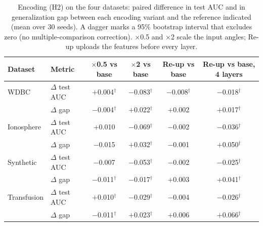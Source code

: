 \begin{table}[t]
\centering
\caption{Encoding (H2) on the four datasets: paired difference in test AUC and in generalization gap between each encoding variant and the reference indicated (mean over 30 seeds). A dagger marks a 95\% bootstrap interval that excludes zero (no multiple-comparison correction). $\times$0.5 and $\times$2 scale the input angles; Re-up uploads the features before every layer.}
\label{tab:h2real}
\footnotesize
\setlength{\tabcolsep}{4pt}
\begin{tabular}{llcccc}
\hline
Dataset & Metric & $\times$0.5 vs base & $\times$2 vs base & Re-up vs base & Re-up vs base, 4 layers \\
\hline
WDBC & $\Delta$ test AUC & $+$0.004$^{\dagger}$ & $-$0.083$^{\dagger}$ & $-$0.008$^{\dagger}$ & $-$0.018$^{\dagger}$ \\
 & $\Delta$ gap & $-$0.004$^{\dagger}$ & $+$0.022$^{\dagger}$ & $+$0.002 & $+$0.017$^{\dagger}$ \\
Ionosphere & $\Delta$ test AUC & $+$0.010 & $-$0.069$^{\dagger}$ & $-$0.002 & $-$0.036$^{\dagger}$ \\
 & $\Delta$ gap & $-$0.015 & $+$0.032$^{\dagger}$ & $-$0.001 & $+$0.050$^{\dagger}$ \\
Synthetic & $\Delta$ test AUC & $-$0.007 & $-$0.053$^{\dagger}$ & $-$0.002 & $-$0.025$^{\dagger}$ \\
 & $\Delta$ gap & $-$0.011$^{\dagger}$ & $-$0.017$^{\dagger}$ & $+$0.003 & $+$0.041$^{\dagger}$ \\
Transfusion & $\Delta$ test AUC & $+$0.010$^{\dagger}$ & $-$0.029$^{\dagger}$ & $-$0.004 & $-$0.026$^{\dagger}$ \\
 & $\Delta$ gap & $-$0.011$^{\dagger}$ & $+$0.023$^{\dagger}$ & $+$0.006 & $+$0.066$^{\dagger}$ \\
\hline
\end{tabular}
\end{table}
